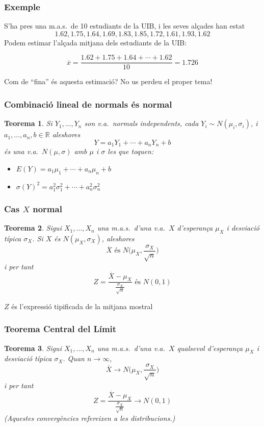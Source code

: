 \documentclass[12pt,t]{beamer}
\renewcommand{\emph}[1]{{\color{red}#1}}
\newcommand{\RR}{\mathbb{R}}
\theoremstyle{plain}
\newtheorem{teorema}{Teorema}
\theoremstyle{definition}
\begin{document}
\begin{frame}
\frametitle{Exemple}

S'ha pres una m.a.s.\ de 10 estudiants de la UIB, i les seves alçades han estat
$$
1.62,1.75,1.64,1.69,1.83,1.85,1.72,1.61,1.93, 1.62
$$
Podem estimar l'alçada mitjana dels estudiants de la UIB:

$$
\overline{x}=\frac{1.62+1.75+1.64+\cdots+1.62}{10}=1.726
$$

Com de ``fina'' és aquesta estimació? No us perdeu el proper tema!

\end{frame}


\begin{frame}
\frametitle{Combinació lineal de normals és normal}
\begin{teorema}
Si $Y_1,\ldots,Y_n$ son v.a.\ normals independents, cada $Y_i\sim N(\mu_i,\sigma_i)$, i $a_1,\ldots,a_n,b\in \RR$ aleshores
$$
Y=a_1Y_1+\cdots+a_nY_n+b
$$
és una v.a.\ $N(\mu,\sigma)$ amb $\mu$ i $\sigma$ les que toquen:
\begin{itemize}
\item $E(Y)=a_1\mu_1+\cdots+a_n\mu_n+b$
\medskip

\item $\sigma(Y)^2=a_1^2\sigma_1^2+\cdots+a_n^2\sigma_n^2$
\end{itemize}
\end{teorema}


\end{frame}




\begin{frame}
\frametitle{Cas $X$ normal}
\begin{teorema}
Sigui $X_1,\ldots, X_n$ una m.a.s.\ d'una v.a.\ $X$ d'esperança $\mu_X$ i desviació típica $\sigma_X$.
Si $X$ és $N(\mu_X,\sigma_X)$, aleshores
$$
\overline{X}\mbox{ és }N\Big(\mu_X,\frac{\sigma_X}{\sqrt{n}}\Big)
$$
i per tant
$$
Z=\frac{\overline{X}-\mu_X}{\frac{\sigma_X}{\sqrt{n}}}\mbox{ és }N(0,1)
$$
\end{teorema}

$Z$ és l'\emph{expressió tipificada} de la mitjana mostral



\end{frame}




\begin{frame}
\frametitle{Teorema Central del Límit}
\begin{teorema}
Sigui $X_1,\ldots, X_n$ una m.a.s.\ d'una v.a.\ $X$ \emph{qualsevol} d'esperança $\mu_X$ i desviació típica $\sigma_X$. Quan $n\to \infty$, 
$$
\overline{X}\to N\Big(\mu_X,\frac{\sigma_X}{\sqrt{n}}\Big)
$$
i per tant
$$
Z=\frac{\overline{X}-\mu_X}{\frac{\sigma_X}{\sqrt{n}}}\to N(0,1)
$$
(Aquestes convergències refereixen a les distribucions.)
\end{teorema}




\end{frame}
\end{document}

